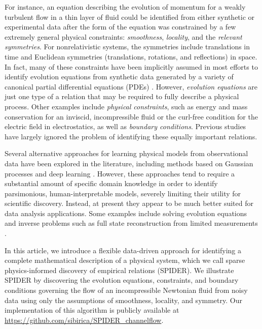 \documentclass[9pt,twocolumn,twoside,lineno]{pnas-new}
\begin{document}
For instance, an equation describing the evolution of momentum for a weakly turbulent flow in a thin layer of fluid could be identified from either synthetic  \cite{reinbold2020} or experimental data \cite{reinbold2021} after the form of the equation was constrained by a few extremely general physical constraints: {\it smoothness}, {\it locality}, and the {\it relevant symmetries}. 
For nonrelativistic systems, the symmetries include translations in time and Euclidean symmetries (translations, rotations, and reflections) in space. In fact, many of these constraints have been implicitly assumed in most efforts to identify evolution equations from synthetic data generated by a variety of canonical partial differential equations (PDEs) \cite{bar1999,xu2008,rudy2017,schaeffer2017,raissi2018}. However, {\it evolution equations} are just one type of a relation that may be required to fully describe a physical process. Other examples include {\it physical constraints}, such as energy and mass conservation for an inviscid, incompressible fluid or the curl-free condition for the electric field in electrostatics, as well as {\it boundary conditions}. Previous studies have largely ignored the problem of identifying these equally important relations.

Several alternative approaches for learning physical models from observational data have been explored in the literature, including methods based on Gaussian processes \cite{raissi2018} and deep learning  \cite{raissi2019}. However, these approaches tend to require a substantial amount of specific domain knowledge in order to identify parsimonious, human-interpretable models, severely limiting their utility for scientific discovery. Instead, at present they appear to be much better suited for data analysis applications. Some examples include solving evolution equations \cite{portwood2019} and inverse problems such as full state reconstruction from limited measurements \cite{raissi2020}.

In this article, we introduce a flexible data-driven approach for identifying a complete mathematical description of a physical system, which we call sparse physics-informed discovery of empirical relations (SPIDER). We illustrate SPIDER by discovering the evolution equations, constraints, and boundary conditions governing the flow of an incompressible Newtonian fluid from noisy data using only the assumptions of smoothness, locality, and symmetry. Our implementation of this algorithm is publicly available at \url{https://github.com/sibirica/SPIDER_channelflow}.  
\end{document}

